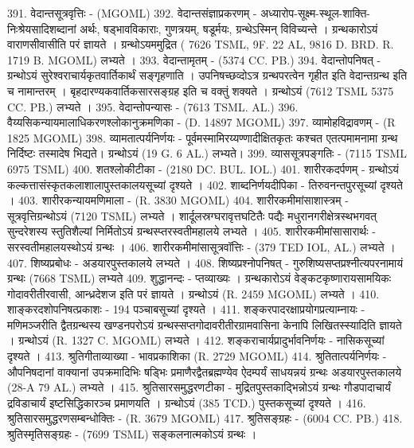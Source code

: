 391. वेदान्तसूत्रवृत्तिः - (MGOML)
392. वेदान्तसंज्ञाप्रकरणम् - अध्यारोप-सूक्ष्म-स्थूल-शाक्ति-निःश्रेयसादिशब्दानां अर्थः, षड्भावविकाराः, गुणत्रयम्, षडूर्मयः, ग्रन्थेऽस्मिन् विविच्यन्ते । ग्रन्थकारोऽयं वाराणसीवासीति परं ज्ञायते । ग्रन्थोऽयममुद्रित ( 7626 TSML, 9F. 22 AL, 9816 D. BRD. R. 1719 B. MGOML) लभ्यते । 
393. वेदान्तामृतम् - (5374 CC. PB.)
394. वेदान्तोपनिषत् - ग्रन्थोऽयं सुरेश्वराचार्यकृतवार्तिकार्थं सङ्गृहणाति । उपनिषच्छव्दोऽत्र ग्रन्थपरत्वेन गृहीत इति वेदान्तग्रन्थ इति च नामान्तरम् । बृहदारण्यकवार्तिकसारसङ्ग्रह इति च वक्तुं शक्यते । ग्रन्थोऽयं (7612 TSML 5375 CC. PB.) लभ्यते । 
395. वेदान्तोपन्यासः - (7613 TSML. AL.)
396. वैय्यसिकन्यायमालाधिकरणश्लोकानुक्रमणिका - (D. 14897 MGOML)
397. व्यामोहविद्रावणम् - (R 1825 MGOML)
398. व्यामतात्पर्यनिर्णयः - पूर्वमस्मामिरय्यण्णादीक्षितकृतः कश्चत एतत्पमामनामा ग्रन्थ निर्दिष्टः तस्मादेष भिद्यते। ग्रन्थोऽयं (19 G. 6 AL.) लभ्यते। 
399. व्याससूत्रपङ्गतिः - (7115 TSML 6975 TSML)
400. शतश्लोकीटीका - (2180 DC. BUL. IOL.)
401. शारीरकदर्पणम् - ग्रन्थोऽयं कल्कत्तासंस्कृतकलाशालापुस्तकालयसूच्यां दृश्यते । 
402. शाब्दनिर्णयदीपिका - तिरुवनन्तपुरसूच्यां दृश्यते । 
403. शारीरकन्यायमणिमाला - (R. 3830 MGOML)
404. शारीरकमीमांसाशास्त्रम् - सूत्रवृत्तिग्रन्थोऽयं (7120 TSML) लभ्यते । शार्दूलस्रग्घरावृत्तघटितैः पद्यैः मधुरानगरीक्षेत्रस्थभगवत् सुन्दरेशस्य स्तुतिशैल्यां निर्मितोऽयं ग्रन्थस्प्तरस्वतीमहालये लभ्यते । 
405. शारीरकमीमांसासारार्थः - सरस्वतीमहालयस्थोऽयं ग्रन्थः । 
406. शारीरकमीमांसासूत्रवॉत्तिः - (379 TED IOL, AL.) लभ्यते । 
407. शिष्यप्रबोधः - अडयारपुस्तकालये लभ्यते । 
408. शिष्यप्रश्नोपनिषत् - गुरुशिष्यसप्तप्रश्नीत्यपरनामायं ग्रन्थः (7668 TSML) लभ्यते 
409. शुद्धानन्दः - प्तव्याख्यः । ग्रन्थकारोऽयं वेङ्कटकृष्णारायसामयिकः गोदावरीतीरवासी, आन्ध्रदेशज इति परं ज्ञायते । ग्रन्थोऽयं (R. 2459 MGOML) लभ्यते । 
410. शाङ्करदशोपनिषत्प्रकाशः - 194 पञ्चाबसूच्यां दृश्यते । 
411. शङ्करपादरक्षाप्रयोगप्रत्याम्नायः - मणिमञ्जरीति द्वैतग्रन्थस्य खण्डनपरोऽयं ग्रन्थस्सप्तगोदावरीतीरग्रामवासिना केनापि लिखितस्स्यादिति ज्ञायते । ग्रन्थोऽयं (R. 1327 C. MGOML) लभ्यते । 
412. शङ्कराचार्यप्रादुर्भावनिर्णयः - नासिकसूच्यां दृश्यते ।
413. श्रुतिगीताव्याख्या - भावप्रकाशिका (R. 2729 MGOML)
414. श्रुतितात्पर्यनिर्णयः - औपनिषदानां वाक्यानां उपक्रमादिभिः षड्भिः प्रमाणैरद्वैतब्रह्मण्येव ऐदम्पर्यं साधयन्नयं ग्रन्थः अडयारपुस्तकालये (28-A 79 AL.) लभ्यते । 
415. श्रुतिसारसमुद्धरणटीका - मुद्रितपुस्तकाद्भिन्नोऽयं ग्रन्थः गौडपादाचार्यं द्रविडाचार्यं इष्टसिद्धिकारञ्च प्रमाणयति । ग्रन्थोऽयं (385 TCD.) पुस्तकसूच्यां दृश्यते । 
416. श्रुतिसारसमुद्धरणसम्बन्धोक्तिः - (R. 3679 MGOML)
417. श्रुतिसङ्ग्रहः - (6004 CC. PB.)
418. श्रुतिस्मृतिसङ्ग्रहः - (7699 TSML) सङ्कलनात्मकोऽयं ग्रन्थः । 
